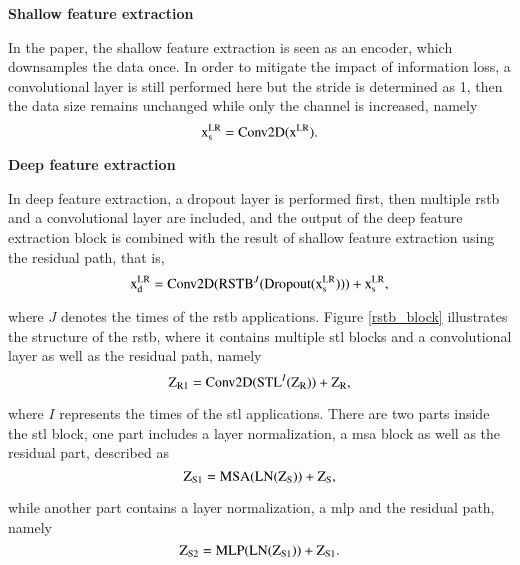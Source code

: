 \begin{spacing}{1.5}
\textbf{\large{Shallow feature extraction}}
\end{spacing}

In the paper, the shallow feature extraction is seen as an encoder, which downsamples the data once. In order to mitigate the impact of information loss, a convolutional layer is still performed here but the stride is determined as 1, then the data size remains unchanged while only the channel is increased, namely
\begin{equation}
    \centering
    \mathrm{x^{LR}_s = Conv2D(x^{LR})}.
    \label{conv2D in shallow feature extraction equation}
\end{equation}

\begin{spacing}{1.5}
\textbf{\large{Deep feature extraction}}
\end{spacing}

In deep feature extraction, a dropout layer is performed first, then multiple \gls{rstb} and a convolutional layer are included, and the output of the deep feature extraction block is combined with the result of shallow feature extraction using the residual path, that is,
\begin{equation}
    \centering
    \text{x}^{\text{LR}}_\text{d} = \text{Conv2D}(\text{RSTB}^{J}(\text{Dropout}(\text{x}^{\text{LR}}_\text{s}))) + \text{x}^{\text{LR}}_\text{s},
    \label{first equation in deep feature extraction}
\end{equation}

where $J$ denotes the times of the \gls{rstb} applications. Figure \ref{rstb_block} illustrates the structure of the \gls{rstb}, where it contains multiple \gls{stl} blocks and a convolutional layer as well as the residual path, namely
\begin{equation}
    \centering
    \mathrm{{Z}_{R1}} = \text{Conv2D}(\text{STL}^{I}(\mathrm{Z_{R}})) + \mathrm{Z_{R}},
\end{equation}

where $I$ represents the times of the \gls{stl} applications. There are two parts inside the \gls{stl} block, one part includes a layer normalization, a \gls{msa} block as well as the residual part, described as
\begin{equation}
    \centering
    \mathrm{Z_{S1} = MSA(LN(Z_{S})) + Z_{S}},
\end{equation}

while another part contains a layer normalization, a \gls{mlp} and the residual path, namely
\begin{equation}
    \centering
    \mathrm{Z_{S2} = MLP(LN(Z_{S1})) + Z_{S1}}.
\end{equation}

